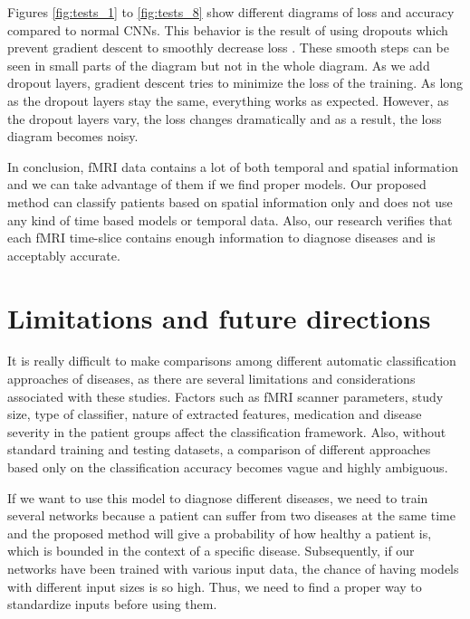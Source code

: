 \documentclass[a4paper,fleqn]{cas-dc}
\begin{document}
Figures \ref{fig:tests_1} to \ref{fig:tests_8} show different diagrams of loss and accuracy compared to normal CNNs. This behavior is the result of using dropouts which prevent gradient descent to smoothly decrease loss \cite{Gal2016}. These smooth steps can be seen in small parts of the diagram but not in the whole diagram. As we add dropout layers, gradient descent tries to minimize the loss of the training. As long as the dropout layers stay the same, everything works as expected. However, as the dropout layers vary, the loss changes dramatically and as a result, the loss diagram becomes noisy.

In conclusion, fMRI data contains a lot of both temporal and spatial information and we can take advantage of them if we find proper models. Our proposed method can classify patients based on spatial information only and does not use any kind of time based models or temporal data. Also, our research verifies that each fMRI time-slice contains enough information to diagnose diseases and is acceptably accurate.











\section{Limitations and future directions}
\label{section:future}
It is really difficult to make comparisons among different automatic classification approaches of diseases, as there are several limitations and considerations associated with these studies. Factors such as fMRI scanner parameters, study size, type of classifier, nature of extracted features, medication and disease severity in the patient groups affect the classification framework. Also, without standard training and testing datasets, a comparison of different approaches based only on the classification accuracy becomes vague and highly ambiguous.

If we want to use this model to diagnose different diseases, we need to train several networks because a patient can suffer from two diseases at the same time and the proposed method will give a probability of how healthy a patient is, which is bounded in the context of a specific disease. Subsequently, if our networks have been trained with various input data, the chance of having models with different input sizes is so high. Thus, we need to find a proper way to standardize inputs before using them.
\end{document}

